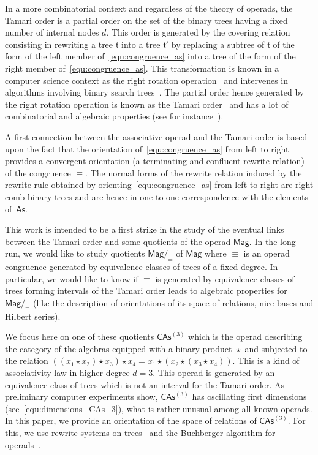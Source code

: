 \documentclass[10pt,reqno]{amsart}
\numberwithin{equation}{subsection}
\newcommand{\Tfr}{\mathfrak{t}}
\newcommand{\Mag}{\mathsf{Mag}}
\newcommand{\As}{\mathsf{As}}
\newcommand{\CAs}[1]{\mathsf{CAs}^{(#1)}}
\DeclareMathOperator{\Product}{\star}
\DeclareMathOperator{\Congr}{\equiv}
\begin{document}
In a more combinatorial context and regardless of the theory of operads,
the Tamari order is a partial order on the set of the binary trees
having a fixed number of internal nodes $d$. This order is generated by
the covering relation consisting in rewriting a tree $\Tfr$ into a tree
$\Tfr'$ by replacing a subtree of $\Tfr$ of the form of the left member
of~\eqref{equ:congruence_as} into a tree of the form of the right member
of~\eqref{equ:congruence_as}. This transformation is known in a computer
science context as the right rotation operation~\cite{Knu98} and
intervenes in algorithms involving binary search trees~\cite{AVL62}. The
partial order hence generated by the right rotation operation is known
as the Tamari order~\cite{Tam62} and has a lot of combinatorial and
algebraic properties (see for instance~\cite{HT72,Cha06}).
\medbreak

A first connection between the associative operad and the Tamari order
is based upon the fact that the orientation of~\eqref{equ:congruence_as}
from left to right provides a convergent orientation (a terminating and
confluent rewrite relation) of the congruence $\Congr$. The normal
forms of the rewrite relation induced by the rewrite rule obtained by
orienting~\eqref{equ:congruence_as} from left to right are right comb
binary trees and are hence in one-to-one correspondence with the
elements of~$\As$.
\medbreak

This work is intended to be a first strike in the study of the eventual
links between the Tamari order and some quotients of the operad $\Mag$.
In the long run, we would like to study quotients $\Mag/_{\Congr}$ of
$\Mag$ where $\Congr$ is an operad congruence generated by equivalence
classes of trees of a fixed degree. In particular, we would like to know
if $\Congr$ is generated by equivalence classes of trees forming
intervals of the Tamari order leads to algebraic properties for
$\Mag/_{\Congr}$ (like the description of orientations of its space of
relations, nice bases and Hilbert series).
\medbreak

We focus here on one of these quotients $\CAs{3}$ which is the operad
describing the category of the algebras equipped with a binary product
$\Product$ and subjected to the relation
\begin{math}
    ((x_1 \Product x_2) \Product x_3) \Product x_4
    =
    x_1 \Product (x_2 \Product (x_3 \Product x_4))
\end{math}.
This is a kind of associativity law in higher degree $d = 3$. This
operad is generated by an equivalence class of trees which is not an
interval for the Tamari order. As preliminary computer experiments show,
$\CAs{3}$ has oscillating first dimensions
(see~\eqref{equ:dimensions_CAs_3}), what is rather unusual among all
known operads. In this paper, we provide an orientation of the space of
relations of $\CAs{3}$. For this, we use rewrite systems on
trees~\cite{BN98} and the Buchberger algorithm for operads~\cite{DK10}.
\medbreak
\end{document}
